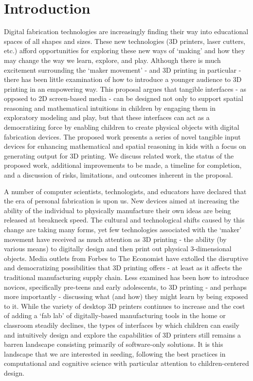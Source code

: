 \chapter{Introduction}
\label{introchap}

Digital fabrication technologies are increasingly finding their way into
educational spaces of all shapes and sizes. These new technologies 
(3D printers, laser cutters, etc.) afford opportunities for exploring these new
ways of `making' and how they may change the way we learn, explore, and play.
Although there is much excitement surrounding the `maker movement' - and 3D
printing in particular - there has been little examination of how to introduce
a younger audience to 3D printing in an empowering way.
This proposal argues that tangible interfaces - as opposed to 2D screen-based
media - can be designed not only to support spatial reasoning and mathematical
intuitions in children by engaging them in exploratory modeling and play, but
that these interfaces can act as a democratizing force by enabling children to
create physical objects with digital fabrication devices.
The proposed work presents a series of novel tangible input devices for
enhancing mathematical and spatial reasoning in kids with a focus on generating
output for 3D printing. We discuss related work, the status of the proposed
work, additional improvements to be made, a timeline for completion,
and a discussion of risks, limitations, and outcomes inherent in the proposal.


A number of computer scientists, technologists, and educators have declared that
the era of personal fabrication is upon
us\cite{anderson2012makers}\cite{Gershenfeld:2007:FCR:1211574}. New devices
aimed at increasing the ability of the individual to physically manufacture
their own ideas are being released at breakneck speed. The cultural and
technological shifts caused by this change are taking many forms, yet few
technologies associated with the `maker' movement have received as much
attention as 3D printing - the ability (by various means) to digitally design
and then print out physical 3-dimensional objects. Media outlets from
Forbes\cite{forbes} to The Economist\cite{economist} have extolled the
disruptive and democratizing possibilities that 3D printing offers - at least as
it affects the traditional manufacturing supply chain. Less examined has been
how to introduce novices, specifically pre-teens and early adolescents, to 3D
printing - and perhaps more importantly - discussing what (and how) they might
learn by being exposed to it.
While the variety of desktop 3D printers continues to increase and the cost of
adding a `fab lab' of digitally-based manufacturing tools in the home or
classroom steadily declines, the types of interfaces by which children can
easily and intuitively design and explore the capabilities of 3D printers still
remains a barren landscape consisting primarily of software-only solutions. It
is this landscape that we are interested in seeding, following the best
practices in computational and cognitive science with particular attention to
children-centered design.

